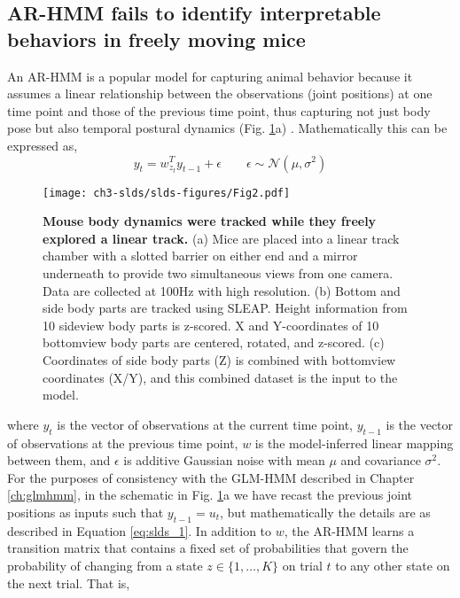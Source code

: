 \subsection{AR-HMM fails to identify interpretable behaviors in freely moving mice}
\label{sec:slds:3.2.2}

An AR-HMM is a popular model for capturing animal behavior because it assumes a linear relationship between the observations (joint positions) at one time point and those of the previous time point, thus capturing not just body pose but also temporal postural dynamics (Fig. \ref{fig:slds:2}a) \cite{wiltschko_mapping_2015, datta_computational_2019, datta_q_2019}. Mathematically this can be expressed as,
\begin{equation} \label{eq:slds_1}
y_t = w_{z_t}^T y_{t-1} + \epsilon \qquad \epsilon \sim \mathcal{N}(\mu,\sigma^2)
\end{equation}

\begin{figure}[t!]
  \begin{center}
    \texttt{[image: ch3-slds/slds-figures/Fig2.pdf]}
    \caption[Mouse body dynamics were tracked while they freely explored a linear track]{\textbf{Mouse body dynamics were tracked while they freely explored a linear track.} (a) Mice are placed into a linear track chamber with a slotted barrier on either end and a mirror underneath to provide two simultaneous views from one camera. Data are collected at 100Hz with high resolution. (b) Bottom and side body parts are tracked using SLEAP. Height information from 10 sideview body parts is z-scored. X and Y-coordinates of 10 bottomview body parts are centered, rotated, and z-scored. (c) Coordinates of side body parts (Z) is combined with bottomview coordinates (X/Y), and this combined dataset is the input to the model. }
    \label{fig:slds:2}
  \end{center}
\end{figure}

where $y_t$ is the vector of observations at the current time point, $y_{t-1}$ is the vector of observations at the previous time point, $w$ is the model-inferred linear mapping between them, and $\epsilon$ is additive Gaussian noise with mean $\mu$ and covariance $\sigma^2$. For the purposes of consistency with the GLM-HMM described in Chapter \ref{ch:glmhmm}, in the schematic in Fig. \ref{fig:slds:2}a we have recast the previous joint positions as inputs such that $y_{t-1}=u_t$, but mathematically the details are as described in Equation \ref{eq:slds_1}. In addition to $w$, the AR-HMM learns a transition matrix that contains a fixed set of probabilities that govern the probability of changing from a state $z \in \{ 1, \ldots ,K\}$ on trial $t$ to any other state on the next trial. That is, 

